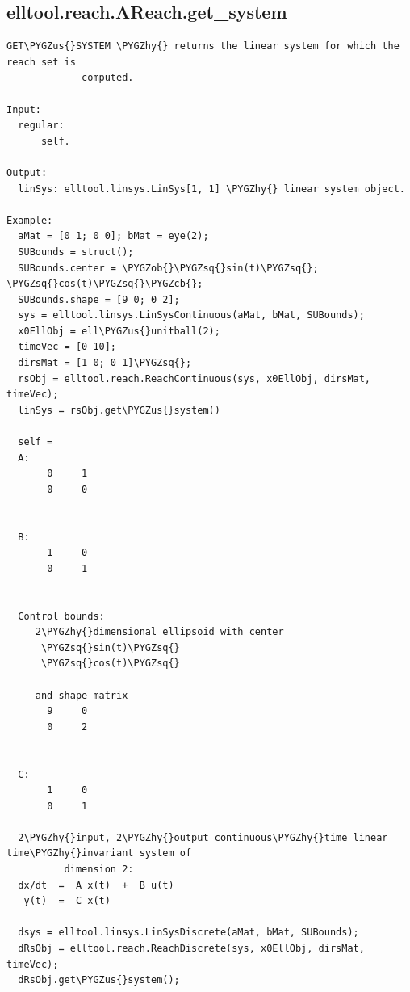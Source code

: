 \documentclass[letterpaper,10pt,english]{sphinxmanual}
\def\PYGZus{\char`\_}
\def\PYGZob{\char`\{}
\def\PYGZcb{\char`\}}
\def\PYGZhy{\char`\-}
\def\PYGZsq{\char`\'}
\begin{document}
\subsection{elltool.reach.AReach.get\_system}
\label{chap_functions:elltool-reach-areach-get-system}
\begin{Verbatim}[commandchars=\\\{\}]
GET\PYGZus{}SYSTEM \PYGZhy{} returns the linear system for which the reach set is
             computed.

Input:
  regular:
      self.

Output:
  linSys: elltool.linsys.LinSys[1, 1] \PYGZhy{} linear system object.

Example:
  aMat = [0 1; 0 0]; bMat = eye(2);
  SUBounds = struct();
  SUBounds.center = \PYGZob{}\PYGZsq{}sin(t)\PYGZsq{}; \PYGZsq{}cos(t)\PYGZsq{}\PYGZcb{};
  SUBounds.shape = [9 0; 0 2];
  sys = elltool.linsys.LinSysContinuous(aMat, bMat, SUBounds);
  x0EllObj = ell\PYGZus{}unitball(2);
  timeVec = [0 10];
  dirsMat = [1 0; 0 1]\PYGZsq{};
  rsObj = elltool.reach.ReachContinuous(sys, x0EllObj, dirsMat, timeVec);
  linSys = rsObj.get\PYGZus{}system()

  self =
  A:
       0     1
       0     0


  B:
       1     0
       0     1


  Control bounds:
     2\PYGZhy{}dimensional ellipsoid with center
      \PYGZsq{}sin(t)\PYGZsq{}
      \PYGZsq{}cos(t)\PYGZsq{}

     and shape matrix
       9     0
       0     2


  C:
       1     0
       0     1

  2\PYGZhy{}input, 2\PYGZhy{}output continuous\PYGZhy{}time linear time\PYGZhy{}invariant system of
          dimension 2:
  dx/dt  =  A x(t)  +  B u(t)
   y(t)  =  C x(t)

  dsys = elltool.linsys.LinSysDiscrete(aMat, bMat, SUBounds);
  dRsObj = elltool.reach.ReachDiscrete(sys, x0EllObj, dirsMat, timeVec);
  dRsObj.get\PYGZus{}system();
\end{Verbatim}
\end{document}
